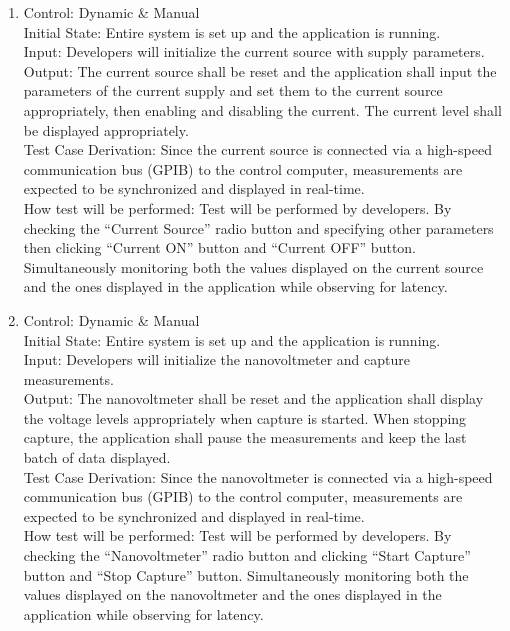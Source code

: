 \documentclass[12pt, titlepage]{article}
\begin{document}
\begin{enumerate}[{FR-T}1.]
    \item Control: Dynamic \& Manual\\
    Initial State: Entire system is set up and the application is running.\\
    Input: Developers will initialize the current source with supply parameters.\\
    Output: The current source shall be reset and the application shall input the parameters of the current supply and set them to the current source appropriately, then enabling and disabling the current. The current level shall be displayed appropriately.\\
    Test Case Derivation: Since the current source is connected via a high-speed communication bus (GPIB) to the control computer, measurements are expected to be synchronized and displayed in real-time.\\
    How test will be performed: Test will be performed by developers. By checking the “Current Source” radio button and specifying other parameters then clicking “Current ON” button and “Current OFF” button. Simultaneously monitoring both the values displayed on the current source and the ones displayed in the application while observing for latency.
    
    \item Control: Dynamic \& Manual\\
    Initial State: Entire system is set up and the application is running.\\
    Input: Developers will initialize the nanovoltmeter and capture measurements.\\
    Output: The nanovoltmeter shall be reset and the application shall display the voltage levels appropriately when capture is started. When stopping capture, the application shall pause the measurements and keep the last batch of data displayed.\\
    Test Case Derivation: Since the nanovoltmeter is connected via a high-speed communication bus (GPIB) to the control computer, measurements are expected to be synchronized and displayed in real-time.\\
    How test will be performed: Test will be performed by developers. By checking the “Nanovoltmeter” radio button and clicking “Start Capture” button and “Stop Capture” button. Simultaneously monitoring both the values displayed on the nanovoltmeter and the ones displayed in the application while observing for latency.
    

\end{enumerate}
\end{document}

